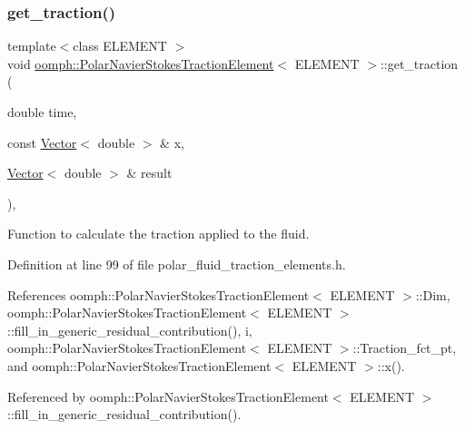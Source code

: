 \subsubsection{\texorpdfstring{get\+\_\+traction()}{get\_traction()}}
{\footnotesize\ttfamily template$<$class E\+L\+E\+M\+E\+NT $>$ \\
void \hyperlink{classoomph_1_1PolarNavierStokesTractionElement}{oomph\+::\+Polar\+Navier\+Stokes\+Traction\+Element}$<$ E\+L\+E\+M\+E\+NT $>$\+::get\+\_\+traction (\begin{DoxyParamCaption}\item[{double}]{time,  }\item[{const \hyperlink{classoomph_1_1Vector}{Vector}$<$ double $>$ \&}]{x,  }\item[{\hyperlink{classoomph_1_1Vector}{Vector}$<$ double $>$ \&}]{result }\end{DoxyParamCaption})\hspace{0.3cm}{\ttfamily [inline]}, {\ttfamily [protected]}}



Function to calculate the traction applied to the fluid. 



Definition at line 99 of file polar\+\_\+fluid\+\_\+traction\+\_\+elements.\+h.



References oomph\+::\+Polar\+Navier\+Stokes\+Traction\+Element$<$ E\+L\+E\+M\+E\+N\+T $>$\+::\+Dim, oomph\+::\+Polar\+Navier\+Stokes\+Traction\+Element$<$ E\+L\+E\+M\+E\+N\+T $>$\+::fill\+\_\+in\+\_\+generic\+\_\+residual\+\_\+contribution(), i, oomph\+::\+Polar\+Navier\+Stokes\+Traction\+Element$<$ E\+L\+E\+M\+E\+N\+T $>$\+::\+Traction\+\_\+fct\+\_\+pt, and oomph\+::\+Polar\+Navier\+Stokes\+Traction\+Element$<$ E\+L\+E\+M\+E\+N\+T $>$\+::x().



Referenced by oomph\+::\+Polar\+Navier\+Stokes\+Traction\+Element$<$ E\+L\+E\+M\+E\+N\+T $>$\+::fill\+\_\+in\+\_\+generic\+\_\+residual\+\_\+contribution().

\mbox{\label{classoomph_1_1PolarNavierStokesTractionElement_a0376005bcf22e0af08e071dba309a1d9}} 
